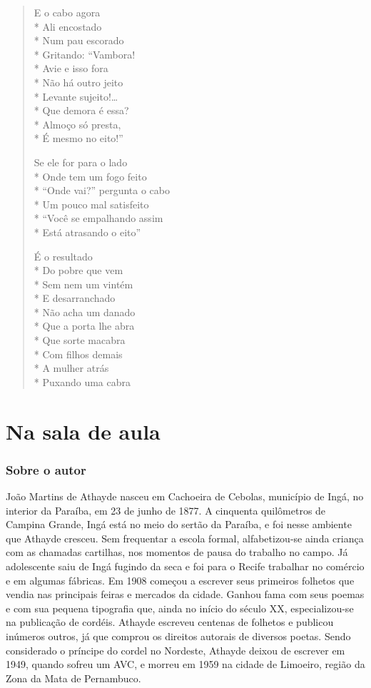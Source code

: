 \begin{verse}
E o cabo agora\\*
Ali encostado\\*
Num pau escorado\\*
Gritando: ``Vambora!\\*
Avie e isso fora\\*
Não há outro jeito\\*
Levante sujeito!\ldots{}\\*
Que demora é essa?\\*
Almoço só presta,\\*
É mesmo no eito!''

Se ele for para o lado\\*
Onde tem um fogo feito\\*
``Onde vai?'' pergunta o cabo\\*
Um pouco mal satisfeito\\*
``Você se empalhando assim\\*
Está atrasando o eito''

É o resultado\\*
Do pobre que vem\\*
Sem nem um vintém\\*
E desarranchado\\*
Não acha um danado\\*
Que a porta lhe abra\\*
Que sorte macabra\\*
Com filhos demais\\*
A mulher atrás\\*
Puxando uma cabra

\end{verse}

\paginabranca

\part{Na sala de aula}

\paginabranca

\section{Sobre o autor}

João Martins de Athayde nasceu em Cachoeira de Cebolas, município de
Ingá, no interior da Paraíba, em 23 de junho de 1877. A cinquenta
quilômetros de Campina Grande, Ingá está no meio do sertão da Paraíba,
e foi nesse ambiente que Athayde cresceu. Sem frequentar a escola
formal, alfabetizou-se ainda criança com as chamadas cartilhas, nos
momentos de pausa do trabalho no campo. Já adolescente saiu de Ingá
fugindo da seca e foi para o Recife trabalhar no comércio e em
algumas fábricas. Em 1908 começou a escrever seus primeiros folhetos
que vendia nas principais feiras e mercados da cidade. Ganhou fama com
seus poemas e com sua pequena tipografia que, ainda no início do século
XX, especializou-se na publicação de cordéis. Athayde escreveu centenas
de folhetos e publicou inúmeros outros, já que comprou os direitos
autorais de diversos poetas. Sendo considerado o príncipe do cordel no
Nordeste, Athayde deixou de escrever em 1949, quando sofreu um AVC, e
morreu em 1959 na cidade de Limoeiro, região da Zona da Mata de
Pernambuco.

